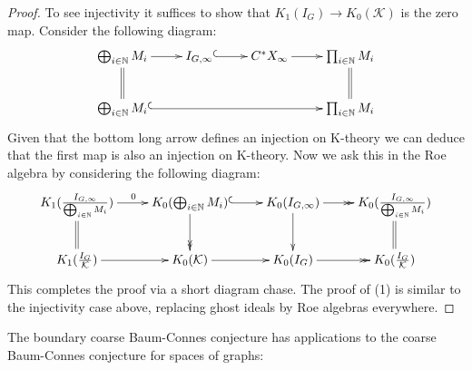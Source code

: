 \documentclass[11pt]{amsart}
\theoremstyle{plain}
\theoremstyle{definition}%
\theoremstyle{remark}%
\begin{document}
\begin{proof}
To see injectivity it suffices to show that $K_{1}(I_{G})\rightarrow K_{0}(\mathcal{K})$ is the zero map. Consider the following diagram:
\begin{equation*}
\xymatrix{\bigoplus_{i \in \mathbb{N}} M_{i} \ar@{->}[r]\ar@{=}[d]  & I_{G,\infty} \ar@{^{(}->}[r]& C^{*}X_{\infty} \ar@{->}[r]& \prod_{i\in \mathbb{N}}M_{i}\ar@{=}[d]\\
\bigoplus_{i \in \mathbb{N}} M_{i}\ar@{^{(}->}[rrr] & & & \prod_{i\in \mathbb{N}}M_{i}
}
\end{equation*}
Given that the bottom long arrow defines an injection on K-theory we can deduce that the first map is also an injection on K-theory. Now we ask this in the Roe algebra by considering the following diagram:
\begin{equation*}
\xymatrix{K_{1}(\frac{I_{G,\infty}}{\bigoplus_{i\in\mathbb{N}}M_{i}})\ar@{->}[r]^{0}\ar@{=}[d]& K_{0}(\bigoplus_{i\in \mathbb{N}}M_{i}) \ar@{^{(}->}[r]\ar@{->>}[d] & K_{0}(I_{G,\infty}) \ar@{->>}[r] \ar@{->}[d] & K_{0}(\frac{I_{G,\infty}}{\bigoplus_{i\in\mathbb{N}}M_{i}})\ar@{=}[d]\\
K_{1}(\frac{I_{G}}{\mathcal{K}})\ar@{->}[r]& K_{0}(\mathcal{K}) \ar@{->}[r] & K_{0}(I_{G}) \ar@{->>}[r]  & K_{0}(\frac{I_{G}}{\mathcal{K}})}
\end{equation*}
This completes the proof via a short diagram chase. The proof of (1) is similar to the injectivity case above, replacing ghost ideals by Roe algebras everywhere.
\end{proof}

The boundary coarse Baum-Connes conjecture has applications to the coarse Baum-Connes conjecture for spaces of graphs:
\end{document}
